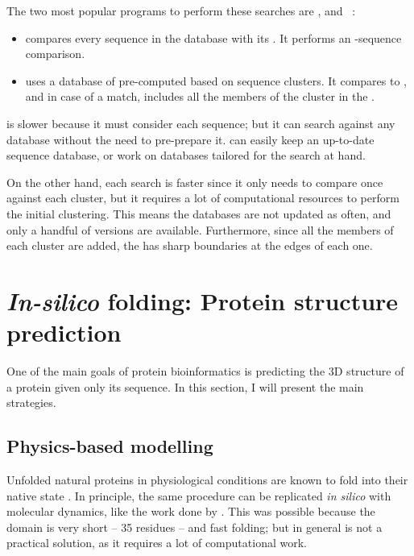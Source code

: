 The two most popular programs to perform these searches are \JackHMMER{} \citep{jh}, and \HHBlits~\citep{hhblits}:

\begin{itemize}
\item \JackHMMER{} compares every sequence in the database with its \HMM.
It performs an \HMM-sequence comparison.
\item \HHBlits{} uses a database of pre-computed \HMMs{} based on sequence clusters.
It compares \HMM{} to \HMM, and in case of a match, includes all the members of the cluster in the \MSA.
\end{itemize}

\JackHMMER{} is slower because it must consider each sequence; but it can search against any database without the need to pre-prepare it. 
\JackHMMER{} can easily keep an up-to-date sequence database, or work on databases tailored for the search at hand.

On the other hand, each \HHBlits{} search is faster since it only needs to compare once against each cluster, but it requires a lot of computational resources to perform the initial clustering.
This means the databases are not updated as often, and only a handful of versions are available.
Furthermore, since all the members of each cluster are added, the \MSA{} has sharp boundaries at the edges of each one.



\section[Protein structure prediction]{\emph{In-silico} folding: Protein structure prediction}
One of the main goals of protein bioinformatics is predicting the 3D structure of a protein given only its sequence.
In this section, I will present the main strategies.

\subsection{Physics-based modelling}
Unfolded natural proteins in physiological conditions are known to fold into their native state \citep{fold_graciously}.
In principle, the same procedure can be replicated \emph{in silico} with molecular dynamics, like the work done by \citet{physics_folding}.
This was possible because the domain is very short -- 35 residues -- and fast folding; but in general is not a practical solution, as it requires a lot of computational work.


